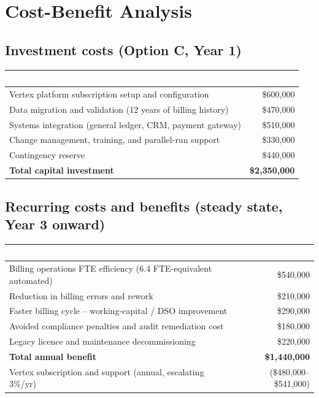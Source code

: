 \section{Cost-Benefit Analysis}

\subsection{Investment costs (Option C, Year 1)}

\begin{center}
\begin{tabularx}{\linewidth}{@{}Y r@{}}
\toprule
{}
\textcolor{white}{\textbf{Cost item}} & \textcolor{white}{\textbf{Amount}} \\
\midrule
Vertex platform subscription setup and configuration & \$600,000 \\
Data migration and validation (12 years of billing history) & \$470,000 \\
Systems integration (general ledger, CRM, payment gateway) & \$510,000 \\
Change management, training, and parallel-run support & \$330,000 \\
Contingency reserve & \$440,000 \\
\midrule
{}
\textbf{Total capital investment} & \textbf{\$2,350,000} \\
\bottomrule
\end{tabularx}
\end{center}

\subsection{Recurring costs and benefits (steady state, Year 3 onward)}

\begin{center}
\footnotesize
\begin{tabularx}{\linewidth}{@{}Y r@{}}
\toprule
{}
\textcolor{white}{\textbf{Annual benefit}} & \textcolor{white}{\textbf{Value}} \\
\midrule
Billing operations FTE efficiency (6.4 FTE-equivalent automated) & \$540,000 \\
Reduction in billing errors and rework & \$210,000 \\
Faster billing cycle -- working-capital / DSO improvement & \$290,000 \\
Avoided compliance penalties and audit remediation cost & \$180,000 \\
Legacy licence and maintenance decommissioning & \$220,000 \\
\midrule
{}
\textbf{Total annual benefit} & \textbf{\$1,440,000} \\
\midrule
Vertex subscription and support (annual, escalating 3\%/yr) & (\$480,000--\$541,000) \\
\bottomrule
\end{tabularx}
\end{center}

